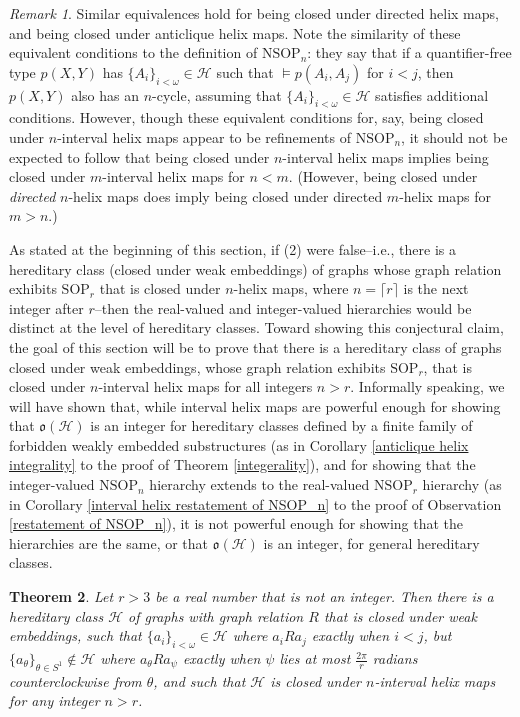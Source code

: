 \documentclass{amsart}
\newtheorem{theorem}{Theorem}[section]
\theoremstyle{definition}
\theoremstyle{remark}
\newtheorem{remark}[theorem]{Remark}
\numberwithin{equation}{section}
\begin{document}
\begin{remark}
Similar equivalences hold for being closed under directed helix maps, and being closed under anticlique helix maps. Note the similarity of these equivalent conditions to the definition of $\mathrm{NSOP}_{n}$: they say that if a quantifier-free type $p(X, Y)$ has $\{A_{i}\}_{i< \omega} \in \mathcal{H}$ such that $\models p(A_{i}, A_{j})$ for $i < j$, then $p(X, Y)$ also has an $n$-cycle, assuming that $\{A_{i}\}_{i< \omega} \in \mathcal{H}$ satisfies additional conditions. However, though these equivalent conditions for, say, being closed under $n$-interval helix maps appear to be refinements of $\mathrm{NSOP}_{n}$, it should not be expected to follow that being closed under $n$-interval helix maps implies being closed under $m$-interval helix maps for $n < m$. (However, being closed under \textit{directed} $n$-helix maps does imply being closed under directed $m$-helix maps for $m > n$.)
    \end{remark}

As stated at the beginning of this section, if (2) were false--i.e., there is a hereditary class (closed under weak embeddings) of graphs whose graph relation exhibits $\mathrm{SOP}_{r}$ that is closed under $n$-helix maps, where $n = \lceil r \rceil$ is the next integer after $r$--then the real-valued and integer-valued hierarchies would be distinct at the level of hereditary classes. Toward showing this conjectural claim, the goal of this section will be to prove that there is a hereditary class of graphs closed under weak embeddings, whose graph relation exhibits $\mathrm{SOP}_{r}$, that is closed under $n$-interval helix maps for all integers $n > r$. Informally speaking, we will have shown that, while interval helix maps are powerful enough for showing that $\mathfrak{o}(\mathcal{H})$ is an integer for hereditary classes defined by a finite family of forbidden weakly embedded substructures (as in Corollary \ref{anticlique helix integrality} to the proof of Theorem \ref{integerality}), and for showing that the integer-valued $\mathrm{NSOP}_{n}$ hierarchy extends to the real-valued $\mathrm{NSOP}_{r}$ hierarchy (as in Corollary \ref{interval helix restatement of NSOP_n} to the proof of Observation \ref{restatement of NSOP_n}), it is not powerful enough for showing that the hierarchies are the same, or that $\mathfrak{o}(\mathcal{H})$ is an integer, for general hereditary classes.

\begin{theorem}\label{interval helix non-integrality}
    Let $r > 3 $ be a real number that is not an integer. Then there is a hereditary class $\mathcal{H}$ of graphs with graph relation $R$ that is closed under weak embeddings, such that  $\{a_{i}\}_{i < \omega} \in \mathcal{H}$ where $a_{i} R a_{j}$ exactly when $i < j$, but $\{a_{\theta}\}_{\theta \in S^{1}} \notin \mathcal{H}$ where $a_{\theta} R a_{\psi}$ exactly when $\psi$ lies at most $\frac{2\pi}{r}$ radians counterclockwise from $\theta$, and such that $\mathcal{H}$ is closed under $n$-interval helix maps for any integer $n > r$.
\end{theorem}
\end{document}
